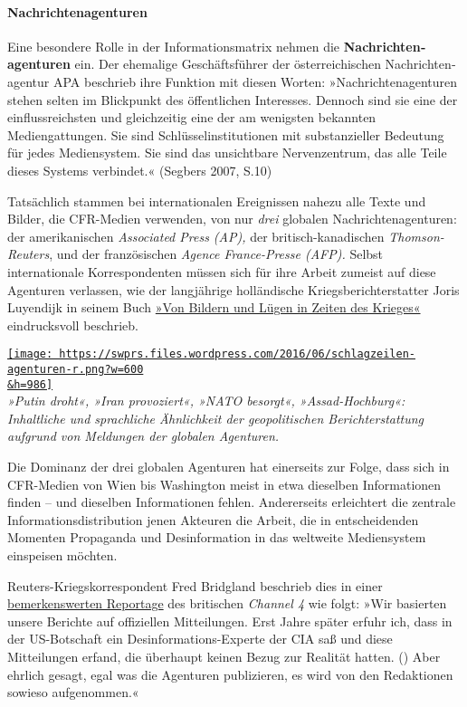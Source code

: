 \hypertarget{nachrichtenagenturen}{%
\paragraph{Nachrichtenagenturen}\label{nachrichtenagenturen}}

Eine besondere Rolle in der Informationsmatrix nehmen die
\textbf{Nachrichten­agenturen} ein. Der ehemalige Geschäftsführer der
österreichischen Nachrichten­agentur APA beschrieb ihre Funktion mit
diesen Worten: »Nachrichten­agenturen stehen selten im Blickpunkt des
öffentlichen Interesses. Dennoch sind sie eine der einflussreichsten und
gleichzeitig eine der am wenigsten bekannten Mediengattungen. Sie sind
Schlüssel­insti­tutionen mit substanzieller Bedeutung für jedes
Mediensystem. Sie sind das unsichtbare Nerven­zentrum, das alle Teile
dieses Systems verbindet.« (Segbers 2007, S.10)

Tatsächlich stammen bei internationalen Ereignissen nahezu alle Texte
und Bilder, die CFR-Medien verwenden, von nur \emph{drei} globalen
Nachrichten­agenturen: der amerikanischen \emph{Associated Press (AP),}
der britisch-kanadischen \emph{Thomson-Reuters}, und der französischen
\emph{Agence France-Presse (AFP).} Selbst internationale Korrespondenten
müssen sich für ihre Arbeit zumeist auf diese Agenturen verlassen, wie
der langjährige holländische Kriegs­bericht­erstatter Joris Luyendijk in
seinem Buch
\href{https://www.klett-cotta.de/buch/Tropen-Sachbuch/Von_Bildern_und_Luegen_in_Zeiten_des_Krieges/48944}{»Von
Bildern und Lügen in Zeiten des Krieges«} eindrucksvoll beschrieb.

\href{https://swprs.files.wordpress.com/2016/06/schlagzeilen-agenturen-r.png}{\texttt{[image: https://swprs.files.wordpress.com/2016/06/schlagzeilen-agenturen-r.png?w=600\\\&h=986]}}\\
\emph{»Putin droht«, »Iran provoziert«, »NATO besorgt«,
»Assad-Hochburg«: Inhaltliche und sprachliche Ähnlichkeit der
geopolitischen Bericht­erstattung aufgrund von Meldungen der globalen
Agenturen.}

Die Dominanz der drei globalen Agenturen hat einerseits zur Folge, dass
sich in CFR-Medien von Wien bis Washington meist in etwa dieselben
Informationen finden -- und dieselben Informationen fehlen. Andererseits
erleichtert die zentrale Informations­distribution jenen Akteuren die
Arbeit, die in entscheidenden Momenten Propaganda und Desinformation in
das weltweite Mediensystem einspeisen möchten.

Reuters-Kriegskorrespondent Fred Bridgland beschrieb dies in einer
\href{https://swprs.org/video-the-cia-and-the-media/}{bemerkenswerten
Reportage} des britischen \emph{Channel 4} wie folgt: »Wir basierten
unsere Berichte auf offiziellen Mitteilungen. Erst Jahre später erfuhr
ich, dass in der US-Botschaft ein Desinformations-Experte der CIA saß
und diese Mitteilungen erfand, die überhaupt keinen Bezug zur Realität
hatten. () Aber ehrlich gesagt, egal was die Agenturen publizieren, es
wird von den Redaktionen sowieso aufgenommen.«

